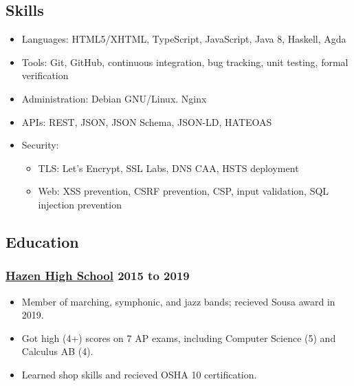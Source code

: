 \documentclass[12pt]{extarticle}
\begin{document}
\subsection{Skills}
\begin{itemize}
\item Languages: HTML5/XHTML, TypeScript, JavaScript, Java 8, Haskell, Agda
\item Tools: Git, GitHub, continuous integration, bug tracking, unit testing, formal verification
\item Administration: Debian GNU/Linux. Nginx
\item APIs: REST, JSON, JSON Schema, JSON-LD, HATEOAS
\item Security:
  \begin{itemize}
  \item TLS: Let's Encrypt, SSL Labs, DNS CAA, HSTS deployment
  \item Web: XSS prevention, CSRF prevention, CSP, input validation, SQL injection prevention
  \end{itemize}
\end{itemize}

\subsection{Education}
\subsubsection{\href{https://www.rentonschools.us/hazen}{Hazen High School} \hfill 2015 to 2019}
\begin{itemize}
\item Member of marching, symphonic, and jazz bands; recieved Sousa award in 2019.
\item Got high (4+) scores on 7 AP exams, including Computer Science (5) and Calculus AB (4).
\item Learned shop skills and recieved OSHA 10 certification.
\end{itemize}
\end{document}
